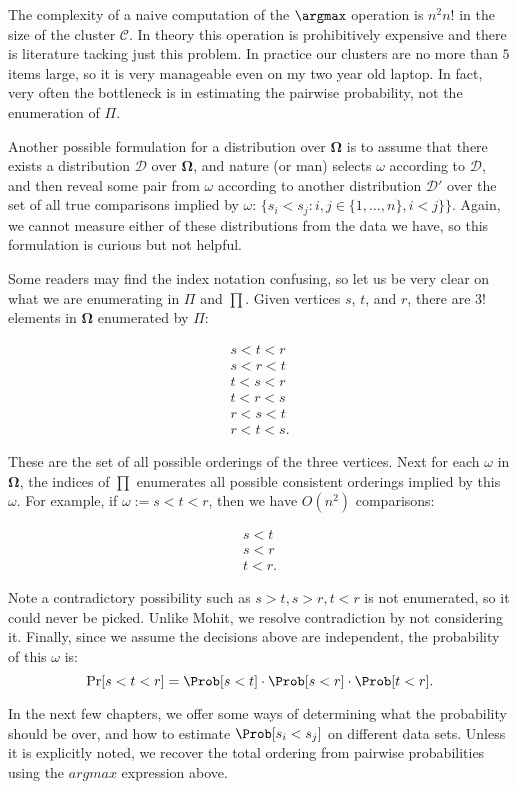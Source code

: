 \begin{remark}
The complexity of a naive computation of the $\argmax$ operation is $n^2 n!$ in the size of the cluster $\mathcal{C}.$ In theory this operation is prohibitively expensive and there is literature tacking just this problem. In practice our clusters are no more than $5$ items large, so it is very manageable even on my two year old laptop. In fact, very often the bottleneck is in estimating the pairwise probability, not the enumeration of $\Pi$.
\end{remark}

\begin{remark}
Another possible formulation for a distribution over $\pmb{\Omega}$ is to assume that there exists a distribution $\mathcal{D}$ over $\pmb{\Omega}$, and nature (or man) selects $\omega$ according to $\mathcal{D}$, and then reveal some pair from $\omega$ according to another distribution $\mathcal{D}'$ over the set of all true comparisons implied by $\omega$: $\{s_i < s_j : i,j \in \{1,\ldots, n\}, i < j\}\}$. Again, we cannot measure either of these distributions from the data we have, so this formulation is curious but not helpful.
\end{remark}

\begin{remark}
Some readers may find the index notation confusing, so let us be very clear on what we are enumerating in $\Pi$ and $\prod$. Given vertices $s$, $t$, and $r$, there are $3!$ elements in $\pmb{\Omega}$ enumerated by $\Pi$:

\begin{align*}
	s < t < r \\
	s < r < t \\
	t < s < r \\
	t < r < s \\
	r < s < t \\
	r < t < s.
\end{align*}

These are the set of all possible orderings of the three vertices. Next for each $\omega$ in $\pmb{\Omega}$, the indices of $\prod$ enumerates all possible consistent orderings implied by this $\omega$. For example, if $\omega := s < t < r$, then we have $O(n^2)$ comparisons:

\begin{align*}
	s < t \\
	s < r \\
	t < r.
\end{align*}

Note a contradictory possibility such as $s > t, s > r, t < r$ is not enumerated, so it could never be picked. Unlike Mohit, we resolve contradiction by not considering it. Finally, since we assume the decisions above are independent, the probability of this $\omega$ is:
\[
	\Pr[ s < t < r] = \Prob[s < t] \cdot \Prob[s < r] \cdot \Prob [t < r].
\]
\end{remark}


In the next few chapters, we offer some ways of determining what the probability should be over, and how to estimate $\Prob[ s_i < s_j ]$ on different data sets.  Unless it is explicitly noted, we recover the total ordering from pairwise probabilities using the $argmax$ expression above.